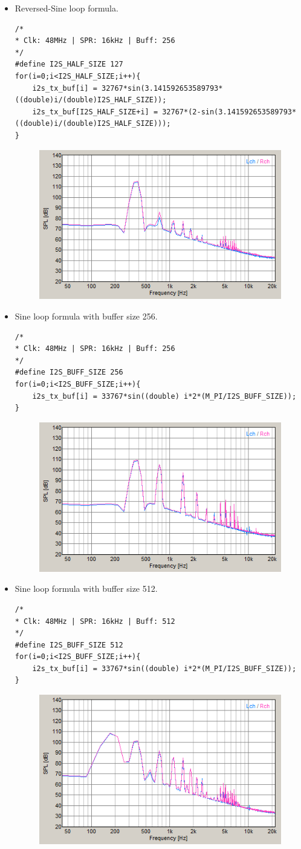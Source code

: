 \documentclass[12pt,]{article}
\begin{document}
\begin{itemize}
\begin{itemize}
			\item Reversed-Sine loop formula.
			\begin{verbatim}
/*
* Clk: 48MHz | SPR: 16kHz | Buff: 256
*/
#define I2S_HALF_SIZE 127	
for(i=0;i<I2S_HALF_SIZE;i++){
	i2s_tx_buf[i] = 32767*sin(3.141592653589793*((double)i/(double)I2S_HALF_SIZE));
	i2s_tx_buf[I2S_HALF_SIZE+i] = 32767*(2-sin(3.141592653589793*((double)i/(double)I2S_HALF_SIZE)));
}
			\end{verbatim}
			\begin{figure}[H]
				\centering
				\includegraphics[width=0.5\linewidth]{result/halfMax256}
			\end{figure}
		
			\newpage
			\item Sine loop formula with buffer size 256.
			\begin{verbatim}
/*
* Clk: 48MHz | SPR: 16kHz | Buff: 256
*/
#define I2S_BUFF_SIZE 256	
for(i=0;i<I2S_BUFF_SIZE;i++){
	i2s_tx_buf[i] = 33767*sin((double) i*2*(M_PI/I2S_BUFF_SIZE));
}
			\end{verbatim}
			\begin{figure}[H]
				\centering
				\includegraphics[width=0.5\linewidth]{result/max256}
			\end{figure}
		
			\item Sine loop formula with buffer size 512.
			\begin{verbatim}
/*
* Clk: 48MHz | SPR: 16kHz | Buff: 512
*/
#define I2S_BUFF_SIZE 512	
for(i=0;i<I2S_BUFF_SIZE;i++){
	i2s_tx_buf[i] = 33767*sin((double) i*2*(M_PI/I2S_BUFF_SIZE));
}
			\end{verbatim}
			\begin{figure}[H]
				\centering
				\includegraphics[width=0.5\linewidth]{result/max512}
			\end{figure}
		

\end{itemize}
\end{itemize}
\end{document}

